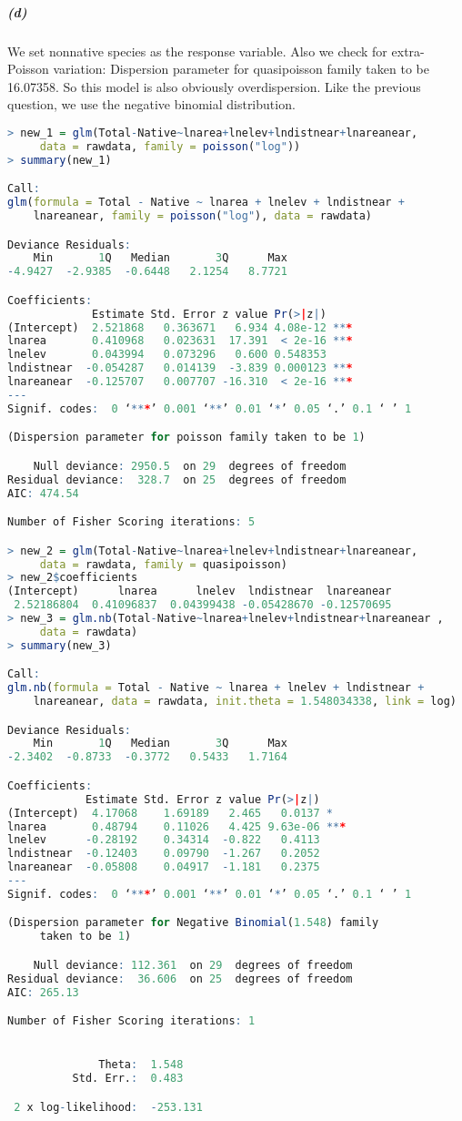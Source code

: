 \documentclass[12pt,a4paper]{article}
\begin{document}
\subparagraph{(d)}
We set nonnative species as the response variable. Also we check for extra-Poisson variation: Dispersion parameter for quasipoisson family taken to be 16.07358. So this model is also obviously overdispersion. Like the previous question, we use the negative binomial distribution.
\begin{lstlisting}[language = R]
> new_1 = glm(Total-Native~lnarea+lnelev+lndistnear+lnareanear, 
     data = rawdata, family = poisson("log")) 
> summary(new_1)

Call:
glm(formula = Total - Native ~ lnarea + lnelev + lndistnear + 
    lnareanear, family = poisson("log"), data = rawdata)

Deviance Residuals: 
    Min       1Q   Median       3Q      Max  
-4.9427  -2.9385  -0.6448   2.1254   8.7721  

Coefficients:
             Estimate Std. Error z value Pr(>|z|)    
(Intercept)  2.521868   0.363671   6.934 4.08e-12 ***
lnarea       0.410968   0.023631  17.391  < 2e-16 ***
lnelev       0.043994   0.073296   0.600 0.548353    
lndistnear  -0.054287   0.014139  -3.839 0.000123 ***
lnareanear  -0.125707   0.007707 -16.310  < 2e-16 ***
---
Signif. codes:  0 ‘***’ 0.001 ‘**’ 0.01 ‘*’ 0.05 ‘.’ 0.1 ‘ ’ 1

(Dispersion parameter for poisson family taken to be 1)

    Null deviance: 2950.5  on 29  degrees of freedom
Residual deviance:  328.7  on 25  degrees of freedom
AIC: 474.54

Number of Fisher Scoring iterations: 5

> new_2 = glm(Total-Native~lnarea+lnelev+lndistnear+lnareanear, 
     data = rawdata, family = quasipoisson) 
> new_2$coefficients 
(Intercept)      lnarea      lnelev  lndistnear  lnareanear 
 2.52186804  0.41096837  0.04399438 -0.05428670 -0.12570695
> new_3 = glm.nb(Total-Native~lnarea+lnelev+lndistnear+lnareanear ,
     data = rawdata) 
> summary(new_3) 

Call:
glm.nb(formula = Total - Native ~ lnarea + lnelev + lndistnear + 
    lnareanear, data = rawdata, init.theta = 1.548034338, link = log)

Deviance Residuals: 
    Min       1Q   Median       3Q      Max  
-2.3402  -0.8733  -0.3772   0.5433   1.7164  

Coefficients:
            Estimate Std. Error z value Pr(>|z|)    
(Intercept)  4.17068    1.69189   2.465   0.0137 *  
lnarea       0.48794    0.11026   4.425 9.63e-06 ***
lnelev      -0.28192    0.34314  -0.822   0.4113    
lndistnear  -0.12403    0.09790  -1.267   0.2052    
lnareanear  -0.05808    0.04917  -1.181   0.2375    
---
Signif. codes:  0 ‘***’ 0.001 ‘**’ 0.01 ‘*’ 0.05 ‘.’ 0.1 ‘ ’ 1

(Dispersion parameter for Negative Binomial(1.548) family 
     taken to be 1)

    Null deviance: 112.361  on 29  degrees of freedom
Residual deviance:  36.606  on 25  degrees of freedom
AIC: 265.13

Number of Fisher Scoring iterations: 1


              Theta:  1.548 
          Std. Err.:  0.483 

 2 x log-likelihood:  -253.131  
\end{lstlisting}
\end{document}
